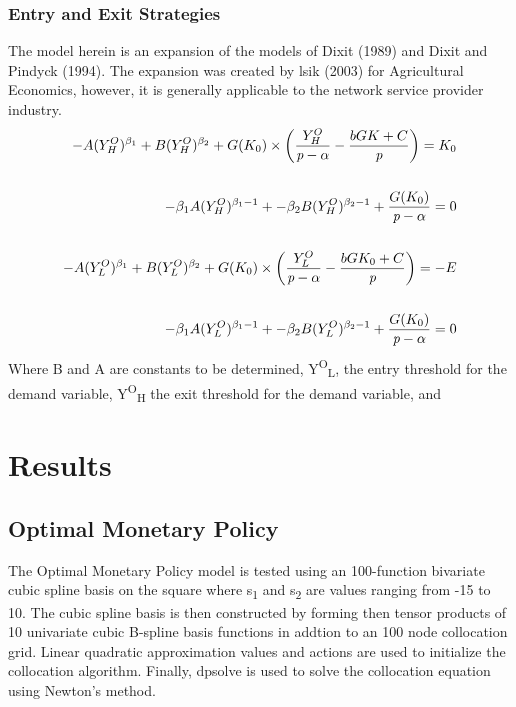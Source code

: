 \documentclass[a4paper,oneside]{article}
\begin{document}
\subsubsection{Entry and Exit Strategies}
	The model herein is an expansion of the models of Dixit (1989) and Dixit and Pindyck (1994). 
The expansion was created by lsik (2003) for Agricultural Economics, however, it is generally applicable to the network service provider industry.
\begin{equation}
	\begin{split}
		-A(Y^O_H)^{\beta_1} + B(Y^O_H)^{\beta_2}  + G(K_0) \times \bigg( \frac{Y^O_H}{\emph{p}-\alpha} -  \frac{bG{K}+C}{\emph{p}}    \bigg) =K_0 
		\\
		\\
		-\beta_1 A (Y^O_H)^{\beta_1-1} + -\beta_2 B (Y^O_H)^{\beta_2-1}  + \frac{G(K_0)}{\emph{p}-\alpha} = 0 
		\\
		\\
		-A(Y^O_L)^{\beta_1} + B(Y^O_L)^{\beta_2} + G(K_0) \times \bigg( \frac{Y^O_L}{\emph{p}-\alpha} -  \frac{bG{K_0}+C}{\emph{p}}    \bigg) = -E
		\\
		\\
		-\beta_1 A (Y^O_L)^{\beta_1-1} + -\beta_2 B (Y^O_L)^{\beta_2-1}  + \frac{G(K_0)}{\emph{p}-\alpha} = 0
	\end{split}
\end{equation}
Where B and A are constants to be determined, Y\textsuperscript{O}\textsubscript{L}, the entry threshold for the demand variable, Y\textsuperscript{O}\textsubscript{H} the exit threshold for the demand variable, and 

\section{Results}\label{sec:res}
\subsection{Optimal Monetary Policy}
\:\:\:\:\:\: The Optimal Monetary Policy model is tested using an 100-function bivariate cubic spline basis on the square where s\textsubscript{1} and s\textsubscript{2} are values ranging from -15 to 10. 
The cubic spline basis is then constructed by forming then tensor products of 10 univariate cubic B-spline basis functions in addtion to an 100 node collocation grid.
Linear quadratic approximation values and actions are used to initialize the collocation algorithm. 
Finally, dpsolve is used to solve the collocation equation using Newton's method.
\end{document}
